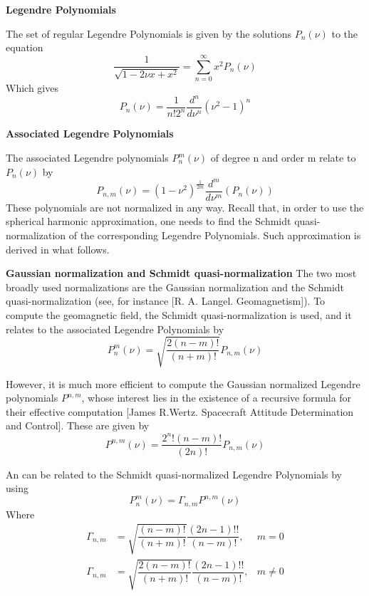 {\bf Legendre Polynomials}

The set of regular Legendre Polynomials is given by the solutions $P_n(\nu)$ to the equation
\begin{equation}
\dfrac{1}{\sqrt{1-2\nu x + x^2}} = \sum_{n=0}^\infty x^2 P_n(\nu)
\end{equation}
Which gives
\begin{equation}
P_n(\nu) = \dfrac{1}{n! 2^n} \dfrac{d^n}{d\nu^n} (\nu^2 -1)^n
\end{equation}

{\bf Associated Legendre Polynomials}

The associated Legendre polynomials $P_n^m(\nu)$ of degree n and order m relate to $P_n(\nu)$ by
\begin{equation}
P_{n,m}(\nu) = (1-\nu^2)^{\frac{1}{2m}} \dfrac{d^m}{d\nu^m}(P_n(\nu))
\end{equation}
These polynomials are not normalized in any way. %
Recall that, in order to use the spherical harmonic approximation, one needs to find the Schmidt quasi-normalization of the corresponding Legendre Polynomials. Such approximation is derived in what follows.

{\bf Gaussian normalization and Schmidt quasi-normalization}
The two most broadly used normalizations are the Gaussian normalization and the Schmidt quasi-normalization (see, for instance [R. A. Langel. Geomagnetism]).
To compute the geomagnetic field, the Schmidt quasi-normalization is used, and it relates to the associated Legendre Polynomials by
\begin{equation}
P_n^m(\nu) = \sqrt{\dfrac{2(n-m)!}{(n+m)!}} P_{n,m}(\nu) 
\end{equation}

However, it is much more efficient to compute the Gaussian normalized Legendre polynomials $P^{n,m}$, whose interest lies in the existence of a recursive formula for their effective computation [James R.Wertz. Spacecraft Attitude Determination and Control]. These are given by
\begin{equation}
P^{n,m}(\nu) = \dfrac{2^n! (n-m)!}{(2n)!} P_{n,m}(\nu)
\end{equation}

An can be related to the Schmidt quasi-normalized Legendre Polynomials by using
\begin{equation}
P_n^m(\nu) = \Gamma_{n,m} P^{n,m}(\nu)
\end{equation}
Where
\begin{equation}
\begin{aligned}
\Gamma_{n,m} &= \sqrt{\dfrac{(n-m)!}{(n+m)!}}\dfrac{(2n-1)!!}{(n-m)!}, &m = 0\\
\Gamma_{n,m} &= \sqrt{\dfrac{2(n-m)!}{(n+m)!}}\dfrac{(2n-1)!!}{(n-m)!}, &m \neq 0
\end{aligned}
\end{equation}

